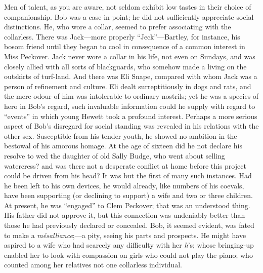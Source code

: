 Men of talent, as you are aware, not seldom exhibit low tastes in their
choice of companionship. Bob was a case in point; he did not
sufficiently appreciate social distinctions. He, who wore a collar,
seemed to prefer associating with the collarless. There was Jack---more
properly ``Jeck''---Bartley, for instance, his bosom friend until they
began to cool in consequence of a common interest in Miss Peckover. Jack
never wore a collar {}in his life, not even on Sundays, and was closely
allied with all sorts of blackguards, who somehow made a living on the
outskirts of turf-land. And there was Eli Snape, compared with whom Jack
was a person of refinement and culture. Eli dealt surreptitiously in
dogs and rats, and the mere odour of him was intolerable to ordinary
nostrils; yet he was a species of hero in Bob's regard, such invaluable
information could he supply with regard to ``events'' in which young
Hewett took a profound interest. Perhaps a more serious aspect of Bob's
disregard for social standing was revealed in his relations with the
other sex. Susceptible from his tender youth, he showed no ambition in
the bestowal of his amorous homage. At the age of sixteen did he not
declare his resolve to wed the daughter of old Sally Budge, who went
about selling watercress? and was there not a desperate conflict at home
before this project could be driven from his head? It was but the first
of many such instances. Had he been left to his own devices, he would
{}already, like numbers of his coevals, have been supporting (or
declining to support) a wife and two or three children. At present, he
was ``engaged'' to Clem Peckover; that was an understood thing. His
father did not approve it, but this connection was undeniably better
than those he had previously declared or concealed. Bob, it seemed
evident, was fated to make a \emph{mésalliance};---a pity, seeing his
parts and prospects. He might have aspired to a wife who had scarcely
any difficulty with her \emph{h}'s; whose bringing-up enabled her to
look with compassion on girls who could not play the piano; who counted
among her relatives not one collarless individual.


